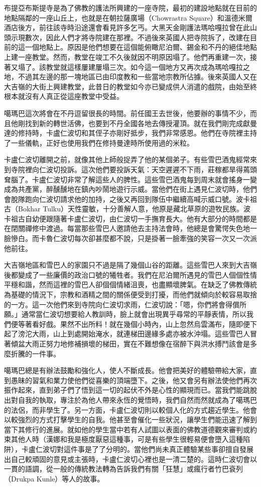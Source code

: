 布提亞布斯提寺是為了佛教的護法所興建的一座寺院，最初的建設地點就在目前的地點隔鄰的一座山丘上，也就是在朝拉薩廣場（Chowrastra
Square）和溫德米爾酒店後方，前往該寺時沿途還會看見許多乞丐。大黑天金剛護法瑪哈嘎拉曾在此山頭示現數次，因此人們才將寺院建在那裡。不過後來英國人把寺院拆了，改建在目前的這一個地點上。原因是他們想要在這個能俯瞰尼泊爾、錫金和不丹的絕佳地點上建一座教堂。然而，教堂在竣工不久後就因不明原因塌了。他們再重建一次，接著又塌了。該教堂就這樣屢建屢塌三次。如今這一個地方又再次成為瑪哈嘎拉之地，不過其左邊的那一塊地區已由印度教和一些當地宗教所佔據。後來英國人又在大吉嶺的大街上興建教堂，此昔日的教堂如今亦已變成供人消遣的戲院，由始至終根本就沒有人真正從這座教堂中受益。

噶瑪巴這次將會在不丹逗留很長的時間。前任國王去世後，他要辦的事情不少，而且他剛找到新的轉世活佛，也要到不丹全國各地去傳授灌頂。就在我們剛完成獻曼達的修持時，卡盧仁波切和其侄子亦剛好抵步，我們非常感恩。他們在寺院裡主持了一些儀軌，正好也使用我們在修持曼達時所使用過的米粒。

卡盧仁波切離開之前，就像其他上師般捉弄了他的某個弟子。有些雪巴酒鬼經常來到寺院裡向仁波切投訴。這次他們要投訴天氣：天空遲遲不下雨，莊稼都旱得蔫頭耷腦了。卡盧仁波切非常了解這些人的脾性。這些雪巴酒鬼每到周末就會搖身一變成為共產黨，醉醺醺地在鎮內吵鬧地遊行示威。當他們在街上遇見仁波切時，他們會脫隊跑向仁波切請求他的加持，之後又再回到隊伍中繼續高喊示威口號。波卡祖古（Bokhar
Tulku）天性靈敏，十分善解人意，他原是藏北草原的遊牧民族。波卡祖古自幼便跟隨著卡盧仁波切，由仁波切一手撫育長大。他有大部分的時間都是在閉關禪修中渡過。每當那些雪巴人邀請他去主持法會時，他總是會驚愕失色地一臉慘白。而卡魯仁波切每次卻甚麼都不說，只是掛著一臉牽強的笑容一次又一次派他前往。

大吉嶺地區和雪巴人的家園只不過是隔了幾個山谷的距離。這些雪巴人來到大吉嶺後都變成了一些廉價的政治口號的犧牲者。我們在尼泊爾所遇見的雪巴人個個性情平穩和諧，然而這裡的雪巴人卻個個情緒沮喪，也盡顯壞脾氣。在缺乏了佛教傳統為基礎的情況下，宗教和酒精之間的關係便受到打擾，而他們就傾向於較容易取捨的一方。這一次他們來到寺院向仁波切求雨，仁波切說：「嗯，你們將會得償所願。」通常當仁波切想要給人教訓時，臉上就會出現異乎尋常的平靜表情，所以我們便等著看好戲。果然不出所料！就在幾個小時內，山上忽然烏雲滿布，隨即便下起了滂沱大雨，山上到處開始淹水，就連梯田邊緣多處亦被水沖塌。這些雪巴人冒著傾盆大雨正努力地修補損壞的梯田，實在不難想像在宿醉下與洪水搏鬥該會是多麼折騰的一件事。

噶瑪巴總是有辦法鼓勵和強化人，使人不斷成長。他會把美好的體驗帶給大家，直到愚昧的習氣和業力使他們從喜樂的頂端墮下。之後，他又會另有辦法使他們再次振作起來，直到弟子們了悟到這一切的起伏不外是心性的顯現而已。當我們能跳脫出對自我的執取，專注於為他人帶來永恆的覺悟時，我們自然而然就成為了噶瑪巴的法侶，而非學生了。另一方面，卡盧仁波切則以較個人化的方式趨近學生。他會以較強烈的方式打擊學生的自我。他甚至會催化一些狀況，讓學生們能迅速了解到當下其修行的進展。就如他的學生當中若有人試圖以表面的佛教道德觀來審判或約束其他人時（漢娜和我是極度厭惡這種事，可是有些學生很輕易便會墮入這種陷阱），卡盧仁波切對這件事是了了分明的。當他們尚未真正體驗某些事卻擅自發展出自己較頑固的意見或主張時，卡盧仁波切心裡也是一清二楚的。這時仁波切會以一貫的語調，從一般的傳統教法轉為告訴我們有關「狂慧」或瘋行者竹巴袞列（Drukpa
Kunle）等人的故事。

